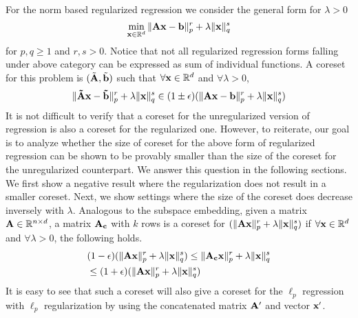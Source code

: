 %
For the norm based regularized regression we consider the general form for $\lambda > 0$
\begin{equation*}
    \min _{\mathbf{x} \in \mathbb{R}^d} \|\mathbf{A}\mathbf{x} - \mathbf{b}\|_p^r	+ \lambda \|\mathbf{x}\|_q^s
\end{equation*}
for $p,q \geq 1$ and $r,s>0$. Notice that not all regularized regression forms falling under above category can be expressed as sum of individual functions. A  coreset for this problem is $(\tilde{\mathbf{A}},\tilde{\mathbf{b}})$ such that $\forall \mathbf{x} \in \mathbb{R}^d$ and $\forall \lambda >0 $, 
	\begin{equation*}
	\|\mathbf{\tilde{A}}{\mathbf{x}} - \mathbf{\tilde{b}}\|_p^r	+ \lambda \|{\mathbf{x}}\|_q^s \in (1\pm\epsilon) (\|\mathbf{A}\mathbf{x} - \mathbf{b}\|_p^r	+ \lambda \|\mathbf{x}\|_q^s)
	\end{equation*} 
It is not difficult to verify that a coreset for the unregularized version of regression  is also a coreset for the regularized one. However, to reiterate, our goal is to analyze whether the size of coreset for the above form of regularized regression can be shown to be provably smaller than the size of the coreset for the unregularized counterpart. We answer this question in the following sections. We first show a negative result where the regularization does not result in a smaller coreset. Next, we show settings where the size of the coreset does decrease inversely with $\lambda$. 
%
Analogous to the subspace embedding, given a matrix $\mathbf{A} \in \mathbb{R}^{n \times d}$,  a matrix $\mathbf{A_c}$ with $k$ rows is a coreset for $(\|\mathbf{Ax}\|_p^r + \lambda \|\mathbf{x}\|_q^s) $ if $\forall{\mathbf{x}} \in \mathbb{R}^d$ and $\forall \lambda > 0$, the following holds.
\begin{equation}
\begin{split}
&(1-\epsilon)(\|\mathbf{Ax}\|_p^r + \lambda \|\mathbf{x}\|_q^s) \leq \|\mathbf{A_cx}\|_p^r + \lambda \|\mathbf{x}\|_q^s\\
&\leq  (1+\epsilon)(\|\mathbf{Ax}\|_p^r + \lambda \|\mathbf{x}\|_q^s)
\label{eq:regcore}
\end{split}
\end{equation}
It is easy to see that such a coreset will also give a coreset for the $\ell_p$ regression with $\ell_p$ regularization by using the concatenated matrix $\mathbf{A'}$ and vector $\mathbf{x'}$.